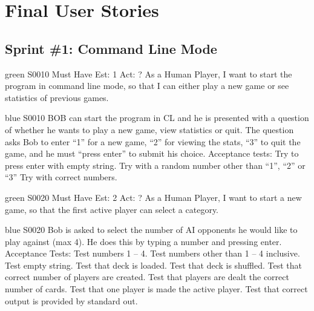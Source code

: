 \newpage
\section{Final User Stories}


\subsection{Sprint \#1: Command Line Mode} 
\label{appendix:user_stories_command_line}
\bigskip


\begin{card}{green}
{S0010}
{Must Have}
{Est: 1}
{Act: ?}
As a Human Player, I want to start the program in command line mode, so that I can either play a new game or see statistics of previous games.
\end{card}

\begin{card}{blue}
{S0010}{}{}{}
BOB can start the program in CL and he is presented with a question of whether he wants to play a new game, view statistics or quit. 
The question asks Bob to enter ``1'' for a new game, ``2'' for viewing the stats, ``3'' to quit the game, and he must ``press enter'' to submit his choice. Acceptance tests: Try to press enter with empty string. 
Try with a random number other than ``1'', ``2'' or ``3'' Try with correct numbers.
\end{card}


\newpage

\begin{card}{green}
{S0020}
{Must Have}
{Est: 2}
{Act: ?}
As a Human Player, I want to start a new game, so that the first active player can select a category.
\end{card}

\begin{card}{blue}
{S0020}{}{}{}
Bob is asked to select the number of AI opponents he would like to play against (max 4). 
He does this by typing a number and pressing enter. 
Acceptance Tests: Test numbers 1 – 4. 
Test numbers other than 1 – 4 inclusive. 
Test empty string. 
Test that deck is loaded. 
Test that deck is shuffled. 
Test that correct number of players are created. 
Test that players are dealt the correct number of cards. 
Test that one player is made the active player. 
Test that correct output is provided by standard out.
\end{card}


